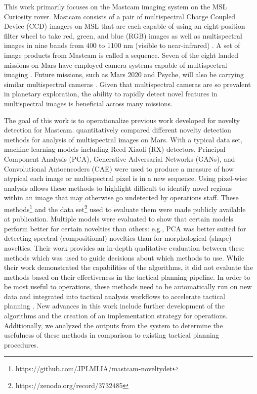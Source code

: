 This work primarily focuses on the Mastcam imaging system on the MSL Curiosity rover.
Mastcam consists of a pair of multispectral Charge Coupled Device (CCD) imagers on MSL that are each capable of using an eight-position filter wheel to take red, green, and blue (RGB) images as well as multispectral images in nine bands from 400 to 1100 nm (visible to near-infrared) \parencite{bell_mastcam}.
A set of image products from Mastcam is called a sequence.
Seven of the eight landed missions on Mars have employed camera systems capable of multispectral imaging \parencite{bell2019tactical}.
Future missions, such as Mars 2020 and Psyche, will also be carrying similar multispectral cameras \parencite{bell2016mastcam} \parencite{bell_psyche}.
Given that multispectral cameras are so prevalent in planetary exploration, the ability to rapidly detect novel features in multispectral images is beneficial across many missions.

The goal of this work is to operationalize previous work developed for novelty detection for Mastcam.
\cite{kerner2020comparison} quantitatively compared different novelty detection methods for analysis of multispectral images on Mars.
With a typical data set, machine learning models including Reed-Xiaoli (RX) detectors, Principal Component Analysis (PCA), Generative Adversarial Networks (GANs), and Convolutional Autoencoders (CAE) were used to produce a measure of how atypical each image or multispectral pixel is in a new sequence. 
Using pixel-wise analysis allows these methods to highlight difficult to identify novel regions within an image that may otherwise go undetected by operations staff.
These methods\footnote{https://github.com/JPLMLIA/mastcam-noveltydet} and the data set\footnote{https://zenodo.org/record/3732485} used to evaluate them were made publicly available at publication. 
Multiple models were evaluated to show that certain models perform better for certain novelties than others: e.g., PCA was better suited for detecting spectral (compositional) novelties than for morphological (shape) novelties. 
Their work provides an in-depth qualitative evaluation between these methods which was used to guide decisions about which methods to use. 
While their work demonstrated the capabilities of the algorithms, it did not evaluate the methods based on their effectiveness in the tactical planning pipeline.
In order to be most useful to operations, these methods need to be automatically run on new data and integrated into tactical analysis workflows to accelerate tactical planning \parencite{donahoe2020new}.
New advances in this work include further development of the algorithms and the creation of an implementation strategy for operations. 
Additionally, we analyzed the outputs from the system to determine the usefulness of these methods in comparison to existing tactical planning procedures. 

